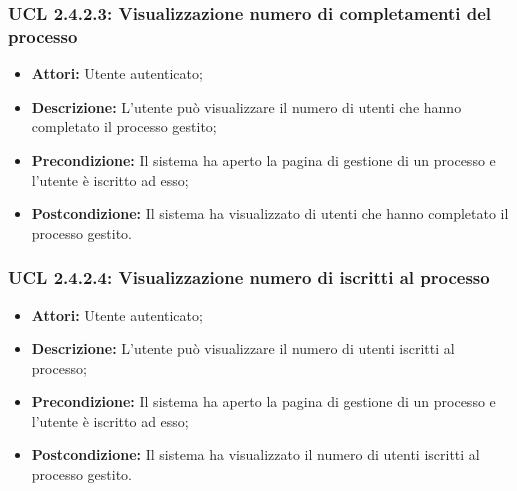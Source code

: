 \subsubsection{UCL 2.4.2.3: Visualizzazione numero di completamenti del processo}
\begin{itemize}
\item \textbf{Attori:} Utente autenticato;
\item \textbf{Descrizione:} L'utente può visualizzare il numero di utenti che hanno completato il processo gestito;
\item \textbf{Precondizione:} Il sistema ha aperto la pagina di gestione di un processo e l'utente è iscritto ad esso;
\item \textbf{Postcondizione:} Il sistema ha visualizzato di utenti che hanno completato il processo gestito.
\end{itemize}

\hypertarget{L2.4.2.4}{}
\subsubsection{UCL 2.4.2.4: Visualizzazione numero di iscritti al processo}
\begin{itemize}
\item \textbf{Attori:} Utente autenticato;
\item \textbf{Descrizione:} L'utente può visualizzare il numero di utenti iscritti al processo;
\item \textbf{Precondizione:} Il sistema ha aperto la pagina di gestione di un processo e l'utente è iscritto ad esso;
\item \textbf{Postcondizione:} Il sistema ha visualizzato il numero di utenti iscritti al processo gestito.
\end{itemize}

\hypertarget{L2.4.3}{}
